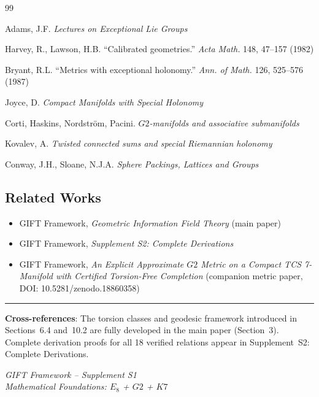 \documentclass[11pt,a4paper]{article}
\newcommand{\E}{\mathrm{E}}
\newcommand{\Gtwo}{\mathrm{G}_2}
\newcommand{\Kseven}{K_7}
\def\Gtwo{G2}%
\def\Kseven{K7}%
\def\E{E}%
\begin{document}
\begin{thebibliography}{99}

 Adams, J.F. \textit{Lectures on Exceptional Lie Groups}

 Harvey, R., Lawson, H.B. ``Calibrated geometries.'' \textit{Acta Math.} 148, 47--157 (1982)

 Bryant, R.L. ``Metrics with exceptional holonomy.'' \textit{Ann. of Math.} 126, 525--576 (1987)

 Joyce, D. \textit{Compact Manifolds with Special Holonomy}

 Corti, Haskins, Nordstr\"om, Pacini. \textit{$\Gtwo$-manifolds and associative submanifolds}

 Kovalev, A. \textit{Twisted connected sums and special Riemannian holonomy}

 Conway, J.H., Sloane, N.J.A. \textit{Sphere Packings, Lattices and Groups}

\end{thebibliography}

\subsection*{Related Works}
\begin{itemize}
\item GIFT Framework, \textit{Geometric Information Field Theory} (main paper)
\item GIFT Framework, \textit{Supplement S2: Complete Derivations}
\item GIFT Framework, \textit{An Explicit Approximate $\Gtwo$ Metric on a Compact TCS 7-Manifold with Certified Torsion-Free Completion} (companion metric paper, DOI: 10.5281/zenodo.18860358)
\end{itemize}

\vfill
\noindent\rule{\textwidth}{0.2pt}

\textbf{Cross-references}: The torsion classes and geodesic framework introduced in Sections~6.4 and~10.2 are fully developed in the main paper (Section~3). Complete derivation proofs for all 18 verified relations appear in Supplement~S2: Complete Derivations.

\vspace{0.5em}
\textit{GIFT Framework -- Supplement S1}\\
\textit{Mathematical Foundations: $\E_8$ + $\Gtwo$ + $\Kseven$}
\end{document}
